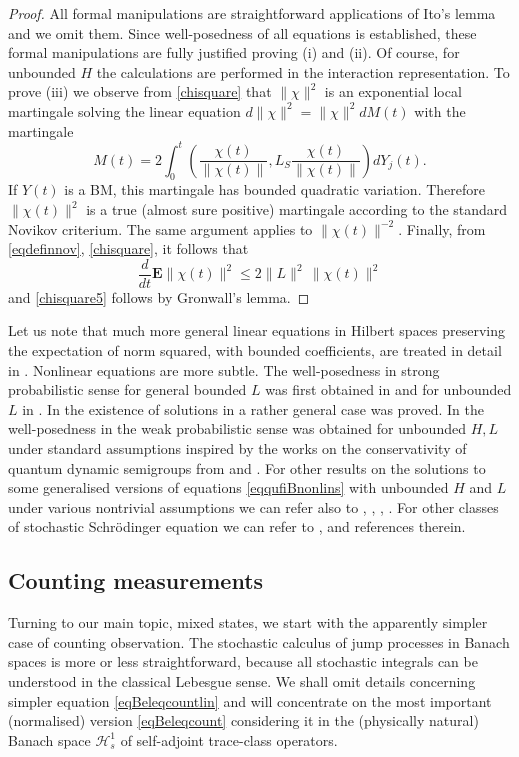 \documentclass[12pt]{article}
\def\HC{\mathcal{H}}
\def\E{\mathbf{E}}
\begin{document}
\begin{proof} All formal manipulations are straightforward applications of Ito's lemma and we omit them.
Since well-posedness of all equations is established, these formal manipulations are fully
justified proving (i) and (ii).
Of course, for unbounded $H$ the calculations are performed in the interaction representation.
To prove (iii) we observe from \eqref{chisquare} that $\|\chi\|^2$ is an exponential local martingale solving
the linear equation $d\|\chi\|^2=\|\chi\|^2 dM(t)$ with the martingale
\[
 M(t)=2\int_0^t \left(\frac{\chi(t)}{\|\chi (t)\|},L_S \frac{\chi(t)}{\|\chi (t)\|}\right)dY_j(t).
 \]
 If $Y(t)$ is a BM, this martingale has bounded quadratic variation. Therefore $\|\chi(t)\|^2$ is a true
 (almost sure positive) martingale according to the standard Novikov criterium.
 The same argument applies to $\|\chi(t)\|^{-2}$. Finally, from \eqref{eqdefinnov}, \eqref{chisquare}, it follows that
 \[
 \frac{d}{dt} \E \|\chi(t)\|^2 \le 2\|L\|^2 \, \|\chi(t)\|^2
 \]
 and  \eqref{chisquare5} follows by Gronwall's lemma.
\end{proof}

Let us note that much
more general linear equations in Hilbert spaces preserving the expectation of norm squared,
with bounded coefficients, are treated in detail in \cite{BarchHol}. Nonlinear equations are
more subtle. The well-posedness in strong probabilistic sense for general bounded $L$ was
first obtained in \cite{KolQuantLLN} and for unbounded $L$ in \cite{Kol25b}. In \cite{BarchHol}
 the existence of solutions in a rather general case was proved.
In \cite{MoraRebo} the well-posedness in the weak probabilistic sense was obtained
for unbounded $H,L$ under standard assumptions inspired by the works on the
conservativity of quantum dynamic semigroups from \cite{ChebFagn} and \cite{ChebQuez}.
For other results on the solutions to some generalised
versions of equations \eqref{eqqufiBnonlins} with unbounded $H$ and $L$
under various nontrivial assumptions we can refer also to  \cite{Holevo91}, \cite{Holevo96}, \cite{Fagnola},
\cite{Mora13}. For other classes  of stochastic Schr\"odinger equation we can refer to \cite{BarbRock16},
\cite{GreckGenerNonlinSchr} and references therein.

\subsection{Counting measurements}

Turning to our main topic, mixed states,
we start with the apparently simpler case of counting observation. The
stochastic calculus of jump processes in Banach spaces is more or less straightforward,
because all stochastic integrals can be understood
in the classical Lebesgue sense.
We shall omit details concerning simpler equation \eqref{eqBeleqcountlin}
and will concentrate on the most important (normalised) version \eqref{eqBeleqcount}
considering it in the (physically natural) Banach space
$\HC^1_s$ of self-adjoint trace-class operators.
\end{document}
